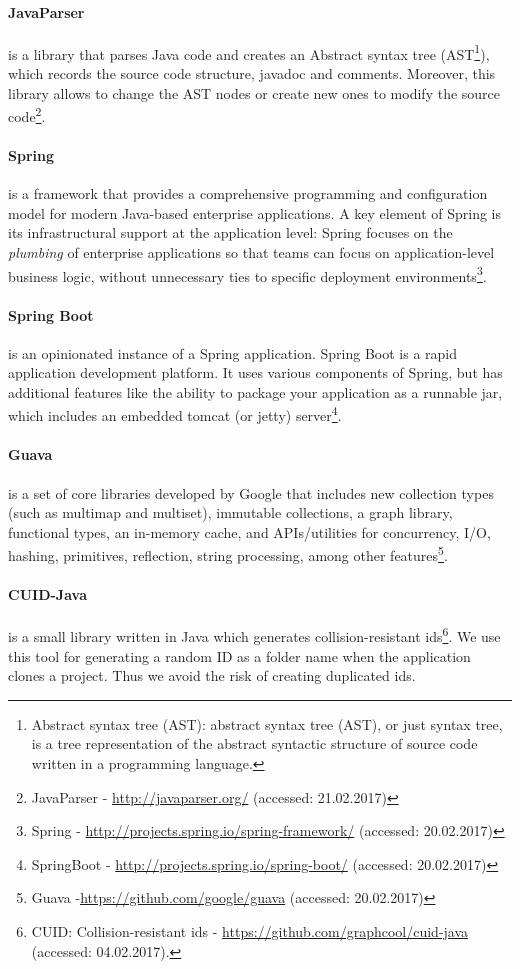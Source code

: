 \paragraph{JavaParser}
is a library that parses Java code and creates an Abstract syntax tree (AST\footnote{Abstract syntax tree (AST): abstract syntax tree (AST), or just syntax tree, is a tree representation of the abstract syntactic structure of source code written in a programming language.}), which records the source code structure, javadoc and comments. Moreover, this library allows to change the AST nodes or create new ones to modify the source code\footnote{JavaParser - \url{http://javaparser.org/} (accessed: 21.02.2017)}.
\paragraph{Spring}
is a framework that provides a comprehensive programming and configuration model for modern Java-based enterprise applications. A key element of Spring is its infrastructural support at the application level: Spring focuses on the \emph{plumbing} of enterprise applications so that teams can focus on application-level business logic, without unnecessary ties to specific deployment environments\footnote{Spring - \url{http://projects.spring.io/spring-framework/} (accessed: 20.02.2017)}.
\paragraph{Spring Boot}
is an opinionated instance of a Spring application. Spring Boot is a rapid application development platform. It uses various components of Spring, but has additional features like the ability to package your application as a runnable jar, which includes an embedded tomcat (or jetty) server\footnote{SpringBoot - \url{http://projects.spring.io/spring-boot/} (accessed: 20.02.2017)}.
\paragraph{Guava}
is a set of core libraries developed by Google that includes new collection types (such as multimap and multiset), immutable collections, a graph library, functional types, an in-memory cache, and APIs/utilities for concurrency, I/O, hashing, primitives, reflection, string processing, among other features\footnote{Guava -\url{https://github.com/google/guava} (accessed: 20.02.2017)}.
\paragraph{CUID-Java}
is a small library written in Java which generates collision-resistant ids\footnote{CUID: Collision-resistant ids - \url{https://github.com/graphcool/cuid-java} (accessed: 04.02.2017).}. We use this tool for generating a random ID as a folder name when the application clones a project. Thus we avoid the risk of creating duplicated ids.
